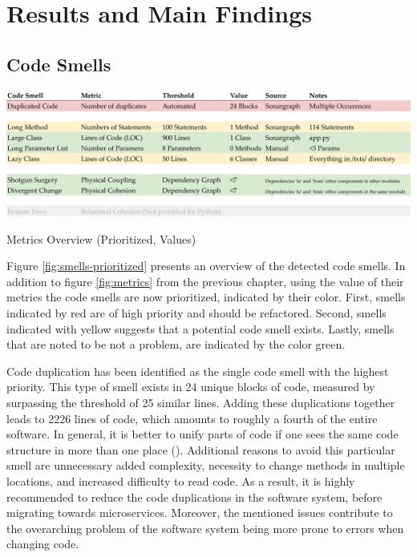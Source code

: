 \chapter{Results and Main Findings}
\label{chapter:findings}

\section{Code Smells}
\label{sec:findings-smells}
\begin{table}[htp]
    \centering
    \includegraphics[width=\textwidth]{./assets/prioritized_smells}
    \label{fig:smells-prioritized}
    \caption{Metrics Overview (Prioritized, Values)}
\end{table}
Figure \ref{fig:smells-prioritized} presents an overview of the detected code smells. In addition to figure \ref{fig:metrics} from the previous chapter, using the value of their metrics the code smells are now prioritized, indicated by their color. First, smells indicated by red are of high priority and should be refactored. Second, smells indicated with yellow suggests that a potential code smell exists. Lastly, smells that are noted to be not a problem, are indicated by the color green. 

%
%

Code duplication has been identified as the single code smell with the highest priority. This type of smell exists in 24 unique blocks of code, measured by surpassing the threshold of 25 similar lines. Adding these duplications together leads to 2226 lines of code, which amounts to roughly a fourth of the entire software. In general, it is better to unify parts of code if one sees the same code structure in more than one place (\cite{fowler2018}). Additional reasons to avoid this particular smell are unnecessary added complexity, necessity to change methods in multiple locations, and increased difficulty to read code. As a result, it is highly recommended to reduce the code duplications in the software system, before migrating towards microservices. Moreover, the mentioned issues contribute to the overarching problem of the software system being more prone to errors when changing code. 

